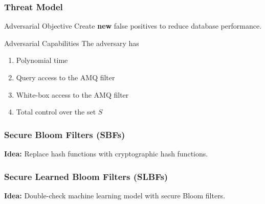 \documentclass{beamer}
\begin{document}
\begin{frame}
\frametitle{Threat Model \cite{bishop_tirmazi_2025} \cite{naor_eylon_2019}}

\begin{block}{Adversarial Objective}
    Create \textbf{new} false positives to reduce database performance.
\end{block}

\vspace{1em}

\begin{block}{Adversarial Capabilities}
    The adversary has
    \begin{enumerate}
        \item Polynomial time
        \item Query access to the AMQ filter
        \item White-box access to the AMQ filter
        \item Total control over the set $S$
    \end{enumerate}
\end{block}

\end{frame}



\begin{frame}
\frametitle{Secure Bloom Filters (SBFs) \cite{naor_eylon_2019}}

\begin{center}
    

    \vspace{1em}

    \textbf{Idea:} Replace hash functions with cryptographic hash functions.
\end{center}

\end{frame}


\begin{frame}
\frametitle{Secure Learned Bloom Filters (SLBFs) \cite{bishop_tirmazi_2025}}

\begin{center}
    

    \vspace{1em}

    \textbf{Idea:} Double-check machine learning model with secure Bloom filters.
\end{center}

\end{frame}
\end{document}
